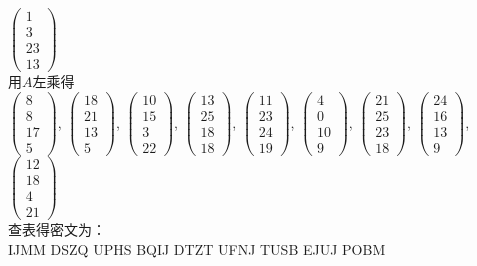 \documentclass[12pt]{article}
\begin{document}
\begin{enumerate}
$\begin{pmatrix}1\\3\\23\\13\end{pmatrix}$\\
用$A$左乘得\\
$\begin{pmatrix}8\\8\\17\\5\end{pmatrix}$,
$\begin{pmatrix}18\\21\\13\\5\end{pmatrix}$,
$\begin{pmatrix}10\\15\\3\\22\end{pmatrix}$,
$\begin{pmatrix}13\\25\\18\\18\end{pmatrix}$,
$\begin{pmatrix}11\\23\\24\\19\end{pmatrix}$,
$\begin{pmatrix}4\\0\\10\\9\end{pmatrix}$,
$\begin{pmatrix}21\\25\\23\\18\end{pmatrix}$,
$\begin{pmatrix}24\\16\\13\\9\end{pmatrix}$,
$\begin{pmatrix}12\\18\\4\\21\end{pmatrix}$\\
查表得密文为：\\
IJMM DSZQ UPHS BQIJ DTZT UFNJ TUSB EJUJ POBM\\


\end{enumerate}
\end{document}
